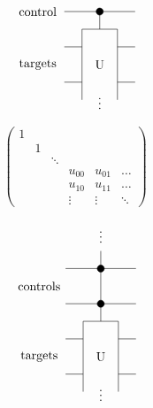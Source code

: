 \documentclass{article}
\begin{document}
\[
             \begin{tikzpicture}[scale=.5]
             \node[draw=none] at (-3.5, 1) {targets};
             \node[draw=none] at (-3.5, 4) {control};      
             
             \draw (-2, 4) -- (2, 4);
             \draw[fill=black] (0, 4) circle (.2);
             \draw(0, 4) -- (0, 3);

             \draw (-2,0) -- (-1, 0);
             \draw (1, 0) -- (2, 0);
             \draw (-2,2) -- (-1, 2);
             \draw (1, 2) -- (2, 2);
             \draw (-1,-1)--(-1,3)--(1,3)--(1,-1);
             \node[draw=none] at (0, 1) {U};
             \node[draw=none] at (0, -1) {$\vdots$};
             
             \end{tikzpicture}
 \]
\pagebreak

\[
\begin{pmatrix}
1 \\
& 1 \\\
& & \ddots \\
& & & u_{00} & u_{01} & \dots  \\
& & & u_{10} & u_{11} & \dots \\
& & & \vdots & \vdots & \ddots
\end{pmatrix}
\]
\pagebreak

\[
             \begin{tikzpicture}[scale=.5]
             \node[draw=none] at (-3.5, 1) {targets};
             \node[draw=none] at (-3.5, 5) {controls};
             
             \node[draw=none] at (0, 8) {$\vdots$};
             \draw (0, 7) -- (0, 6);
             
             \draw (-2, 6) -- (2, 6);
             \draw[fill=black] (0, 6) circle (.2);
             \draw (0, 6) -- (0, 4);         
             
             \draw (-2, 4) -- (2, 4);
             \draw[fill=black] (0, 4) circle (.2);
             \draw(0, 4) -- (0, 3);

             \draw (-2,0) -- (-1, 0);
             \draw (1, 0) -- (2, 0);
             \draw (-2,2) -- (-1, 2);
             \draw (1, 2) -- (2, 2);
             \draw (-1,-1)--(-1,3)--(1,3)--(1,-1);
             \node[draw=none] at (0, 1) {U};
             \node[draw=none] at (0, -1) {$\vdots$};
             
             \end{tikzpicture}
 \]
\pagebreak
\end{document}
